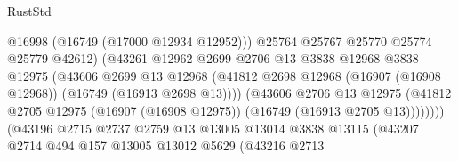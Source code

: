\begin{lexlean}{RustStd}
\begin{coremodule}
                                            @16998
                                            (@16749 (@17000 @12934 @12952)))
                                          @25764
                                          @25767
                                          @25770
                                          @25774
                                          @25779
                                          @42612)
                                        (@43261
                                          @12962
                                          @2699
                                          @2706
                                          @13
                                          @3838
                                          @12968
                                          @3838
                                          @12975
                                          (@43606
                                            @2699
                                            @13
                                            @12968
                                            (@41812
                                              @2698
                                              @12968
                                              (@16907 (@16908 @12968))
                                              (@16749 (@16913 @2698 @13))))
                                          (@43606
                                            @2706
                                            @13
                                            @12975
                                            (@41812
                                              @2705
                                              @12975
                                              (@16907 (@16908 @12975))
                                              (@16749 (@16913 @2705 @13))))))))
                                  (@43196
                                    @2715
                                    @2737
                                    @2759
                                    @13
                                    @13005
                                    @13014
                                    @3838
                                    @13115
                                    (@43207
                                      @2714
                                      @494
                                      @157
                                      @13005
                                      @13012
                                      @5629
                                      (@43216
                                        @2713

\end{coremodule}
\end{lexlean}
